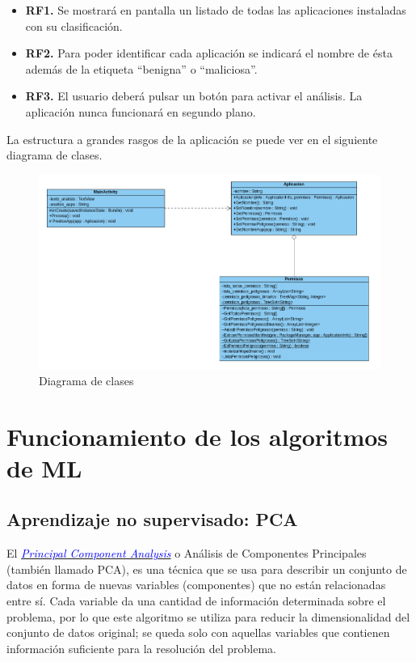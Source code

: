 \begin{itemize}
	\item \textbf{RF1.} Se mostrará en pantalla un listado de todas las aplicaciones instaladas con su clasificación.
	\item \textbf{RF2.} Para poder identificar cada aplicación se indicará el nombre de ésta además de la etiqueta ``benigna'' o ``maliciosa''.
	\item \textbf{RF3.} El usuario deberá pulsar un botón para activar el análisis. La aplicación nunca funcionará en segundo plano.
\end{itemize}

La estructura a grandes rasgos de la aplicación se puede ver en el siguiente diagrama de clases.

\begin{figure}[H]
\centering
	\includegraphics[scale=0.37]{img/uml.png}
	\caption{Diagrama de clases}
\end{figure}

\section{Funcionamiento de los algoritmos de ML}
\label{sec53}

\subsection{Aprendizaje no supervisado: PCA}

El \textit{\href{https://en.wikipedia.org/wiki/Principal_component_analysis}{\textcolor{blue}{Principal Component Analysis}}} o Análisis de Componentes Principales (también llamado PCA), es una técnica que se usa para describir un conjunto de datos en forma de nuevas variables (componentes) que no están relacionadas entre sí. Cada variable da una cantidad de información determinada sobre el problema, por lo que este algoritmo se utiliza para reducir la dimensionalidad del conjunto de datos original; se queda solo con aquellas variables que contienen información suficiente para la resolución del problema.

